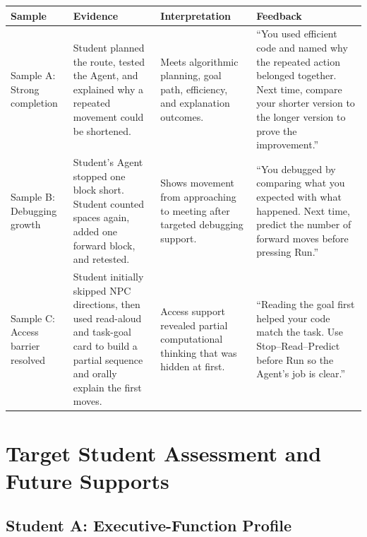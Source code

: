 \documentclass[12pt]{article}
\begin{document}
\begin{xltabular}{\textwidth}{|P{1.0in}|P{2.0in}|P{1.2in}|P{2.0in}|}
\hline
{}\color{white}\bfseries Sample & \color{white}\bfseries Evidence & \color{white}\bfseries Interpretation & \color{white}\bfseries Feedback \\
\hline
Sample A: Strong completion & Student planned the route, tested the Agent, and explained why a repeated movement could be shortened. & Meets algorithmic planning, goal path, efficiency, and explanation outcomes. & ``You used efficient code and named why the repeated action belonged together. Next time, compare your shorter version to the longer version to prove the improvement.'' \\
\hline
{} Sample B: Debugging growth & Student's Agent stopped one block short. Student counted spaces again, added one forward block, and retested. & Shows movement from approaching to meeting after targeted debugging support. & ``You debugged by comparing what you expected with what happened. Next time, predict the number of forward moves before pressing Run.'' \\
\hline
Sample C: Access barrier resolved & Student initially skipped NPC directions, then used read-aloud and task-goal card to build a partial sequence and orally explain the first moves. & Access support revealed partial computational thinking that was hidden at first. & ``Reading the goal first helped your code match the task. Use Stop--Read--Predict before Run so the Agent's job is clear.'' \\
\hline
\end{xltabular}

\section{Target Student Assessment and Future Supports}

\subsection{Student A: Executive-Function Profile}
\end{document}
